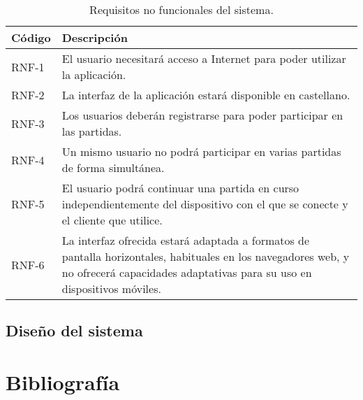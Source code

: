 \documentclass[11pt, a4paper, titlepage]{article}
\begin{document}
\begin{table}[h!]
    \centering
    \begin{tabularx}{\textwidth}{|l|X|}
         \hline
         Código & Descripción \\
         \hline
         RNF-1 & El usuario necesitará acceso a Internet para poder utilizar la aplicación.\\
         RNF-2 & La interfaz de la aplicación estará disponible en castellano.\\
         RNF-3 & Los usuarios deberán registrarse para poder participar en las partidas.\\
         RNF-4 & Un mismo usuario no podrá participar en varias partidas de forma simultánea. \\
         RNF-5 & El usuario podrá continuar una partida en curso independientemente del dispositivo con el que se conecte y el cliente que utilice.\\
         RNF-6 & La interfaz ofrecida estará adaptada a formatos de pantalla horizontales, habituales en los navegadores web, y no ofrecerá capacidades adaptativas para su uso en dispositivos móviles.\\
         \hline
    \end{tabularx}
    \caption{Requisitos no funcionales del sistema.}
    \label{tab:rnf}
\end{table}
\subsection{Diseño del sistema}




\clearpage

\newpage
\section{Bibliografía}
\printbibliography
\end{document}
